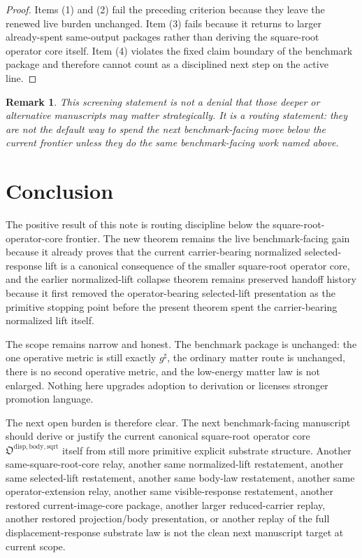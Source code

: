 \documentclass[11pt]{article}
\newcommand{\CompletedMetric}{g^{\sharp}}
\newcommand{\SquareRootOperatorCore}{\mathfrak O^{\mathrm{disp,body,sqrt}}}
\newtheorem{remark}{Remark}
\begin{document}
\begin{proof}
Items (1) and (2) fail the preceding criterion because they leave the renewed live burden unchanged. Item (3) fails because it returns to larger already-spent same-output packages rather than deriving the square-root operator core itself. Item (4) violates the fixed claim boundary of the benchmark package and therefore cannot count as a disciplined next step on the active line.
\end{proof}

\begin{remark}
This screening statement is not a denial that those deeper or alternative manuscripts may matter strategically. It is a routing statement: they are not the default way to spend the next benchmark-facing move below the current frontier unless they do the same benchmark-facing work named above.
\end{remark}

\section{Conclusion}

The positive result of this note is routing discipline below the square-root-operator-core frontier. The new theorem remains the live benchmark-facing gain because it already proves that the current carrier-bearing normalized selected-response lift is a canonical consequence of the smaller square-root operator core, and the earlier normalized-lift collapse theorem remains preserved handoff history because it first removed the operator-bearing selected-lift presentation as the primitive stopping point before the present theorem spent the carrier-bearing normalized lift itself.

The scope remains narrow and honest. The benchmark package is unchanged: the one operative metric is still exactly \(\CompletedMetric\), the ordinary matter route is unchanged, there is no second operative metric, and the low-energy matter law is not enlarged. Nothing here upgrades adoption to derivation or licenses stronger promotion language.

The next open burden is therefore clear. The next benchmark-facing manuscript should derive or justify the current canonical square-root operator core \(\SquareRootOperatorCore\) itself from still more primitive explicit substrate structure. Another same-square-root-core relay, another same normalized-lift restatement, another same selected-lift restatement, another same body-law restatement, another same operator-extension relay, another same visible-response restatement, another restored current-image-core package, another larger reduced-carrier replay, another restored projection/body presentation, or another replay of the full displacement-response substrate law is not the clean next manuscript target at current scope.
\end{document}
